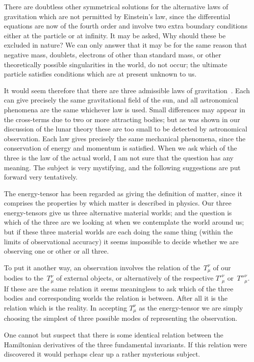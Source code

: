 \documentclass[12pt]{book}
\begin{document}
There are doubtless other symmetrical solutions for the alternative laws
of gravitation which are not permitted by Einstein's law, since the differential
equations are now of the fourth order and involve two extra boundary conditions
either at the particle or at infinity. It may be asked, Why should
these be excluded in nature? We can only answer that it may be for the
same reason that negative mass, doublets, electrons of other than standard
mass, or other theoretically possible singularities in the world, do not occur;
the ultimate particle satisfies conditions which are at present unknown to us.

It would seem therefore that there are three admissible laws of gravitation~.
Each can give precisely the same gravitational field of the sun, and
all astronomical phenomena are the same whichever law is used. Small
differences may appear in the cross-terms due to two or more attracting
bodies; but as was shown in our discussion of the lunar theory these are too
small to be detected by astronomical observation. Each law gives precisely
the same mechanical phenomena, since the conservation of energy and
momentum is satisfied. When we ask which of the three is the law of the
actual world, I am not sure that the question has any meaning. The subject
is very mystifying, and the following suggestions are put forward very
tentatively.

The energy\hyp{}tensor has been regarded as giving the definition of matter,
since it comprises the properties by which matter is described in physics.
Our three energy\hyp{}tensors give us three alternative material worlds; and the
question is which of the three are we looking at when we contemplate the
world around us; but if these three material worlds are each doing the same
thing (within the limits of observational accuracy) it seems impossible to
decide whether we are observing one or other or all three.

To put it another way, an observation involves the relation of the~$T_{\mu}^{\nu}$ of
our bodies to the~$T_{\mu}^{\nu}$ of external objects, or alternatively of the respective
${T'}_{\mu}^{\nu}$ or~${T''}_{\mu}^{\nu}$. If these are the same relation it seems meaningless to ask which
of the three bodies and corresponding worlds the relation is between. After
all it is the relation which is the reality. In accepting $T_{\mu}^{\nu}$ as the energy\hyp{}tensor
we are simply choosing the simplest of three possible modes of representing
the observation.

One cannot but suspect that there is some identical relation between the
Hamiltonian derivatives of the three fundamental invariants. If this relation
were discovered it would perhaps clear up a rather mysterious subject.
\end{document}
